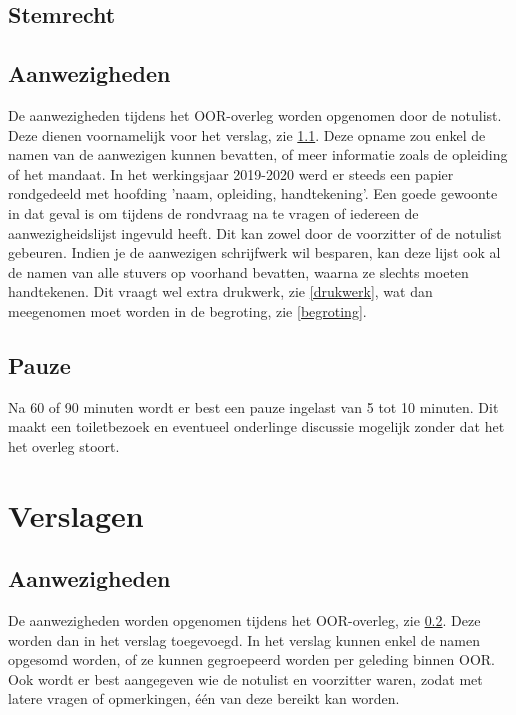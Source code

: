 \documentclass[a4paper,11pt]{article}
\begin{document}
		\subsection{Stemrecht}
	
		\subsection{Aanwezigheden}
		\label{overleg-aanwezigheden}
		
	
		De aanwezigheden tijdens het OOR-overleg worden opgenomen door de notulist. Deze dienen voornamelijk voor het verslag, zie \ref{verslag-aanwezigheden}. Deze opname zou enkel de namen van de aanwezigen kunnen bevatten, of meer informatie zoals de opleiding of het mandaat. In het werkingsjaar 2019-2020 werd er steeds een papier rondgedeeld met hoofding 'naam, opleiding, handtekening'. Een goede gewoonte in dat geval is om tijdens de rondvraag na te vragen of iedereen de aanwezigheidslijst ingevuld heeft. Dit kan zowel door de voorzitter of de notulist gebeuren. Indien je de aanwezigen schrijfwerk wil besparen, kan deze lijst ook al de namen van alle stuvers op voorhand bevatten, waarna ze slechts moeten handtekenen. Dit vraagt wel extra drukwerk, zie \ref{drukwerk}, wat dan meegenomen moet worden in de begroting, zie \ref{begroting}.
		
		\subsection{Pauze}
		
		Na 60 of 90 minuten wordt er best een pauze ingelast van 5 tot 10 minuten. Dit maakt een toiletbezoek en eventueel onderlinge discussie mogelijk zonder dat het het overleg stoort.
	
	\section{Verslagen}
	\label{verslag}
	
		\subsection{Aanwezigheden}
		\label{verslag-aanwezigheden}

		De aanwezigheden worden opgenomen tijdens het OOR-overleg, zie \ref{overleg-aanwezigheden}. Deze worden dan in het verslag toegevoegd. In het verslag kunnen enkel de namen opgesomd worden, of ze kunnen gegroepeerd worden per geleding binnen OOR. Ook wordt er best aangegeven wie de notulist en voorzitter waren, zodat met latere vragen of opmerkingen, één van deze bereikt kan worden.
	
\end{document}
